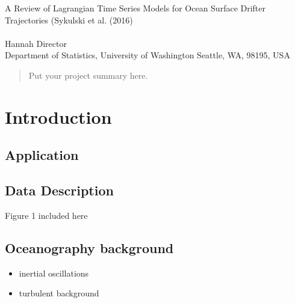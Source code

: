 \documentclass{stat572Style}
\begin{document}

\begin{center}
  {\LARGE A Review of Lagrangian Time Series Models for Ocean Surface Drifter Trajectories (Sykulski et al. (2016)}\\\ \\
  {Hannah Director \\ 
    Department of Statistics, University of Washington Seattle, WA, 98195, USA
  }
\end{center}



\begin{abstract}
  Put your project summary here.
\end{abstract}

\section{Introduction}
	\subsection{Application}
		\subsection{Data Description}
			Figure 1 included here 
		\subsection{Oceanography background}
			\begin{itemize}
				\item inertial oscillations
				\item turbulent background
			\end{itemize}
			
\end{document}
